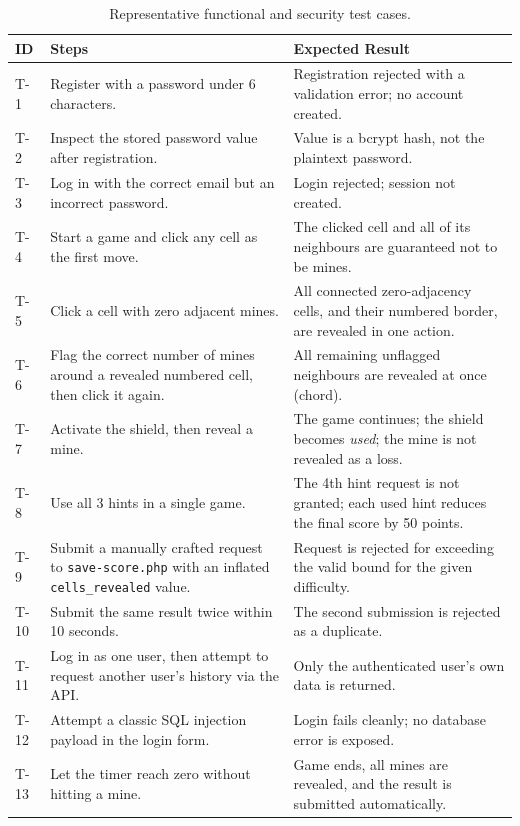 \begin{table}[h]
\centering
\caption{Representative functional and security test cases.}
\label{tab:test-cases}
\begin{tabular}{@{}p{1.2cm}p{5.3cm}p{6.2cm}@{}}
\toprule
\textbf{ID} & \textbf{Steps} & \textbf{Expected Result} \\
\midrule
T-1 & Register with a password under 6 characters. & Registration rejected with a validation error; no account created. \\
T-2 & Inspect the stored password value after registration. & Value is a bcrypt hash, not the plaintext password. \\
T-3 & Log in with the correct email but an incorrect password. & Login rejected; session not created. \\
T-4 & Start a game and click any cell as the first move. & The clicked cell and all of its neighbours are guaranteed not to be mines. \\
T-5 & Click a cell with zero adjacent mines. & All connected zero-adjacency cells, and their numbered border, are revealed in one action. \\
T-6 & Flag the correct number of mines around a revealed numbered cell, then click it again. & All remaining unflagged neighbours are revealed at once (chord). \\
T-7 & Activate the shield, then reveal a mine. & The game continues; the shield becomes \emph{used}; the mine is not revealed as a loss. \\
T-8 & Use all 3 hints in a single game. & The 4th hint request is not granted; each used hint reduces the final score by 50 points. \\
T-9 & Submit a manually crafted request to \texttt{save-score.php} with an inflated \texttt{cells\_revealed} value. & Request is rejected for exceeding the valid bound for the given difficulty. \\
T-10 & Submit the same result twice within 10 seconds. & The second submission is rejected as a duplicate. \\
T-11 & Log in as one user, then attempt to request another user's history via the API. & Only the authenticated user's own data is returned. \\
T-12 & Attempt a classic SQL injection payload in the login form. & Login fails cleanly; no database error is exposed. \\
T-13 & Let the timer reach zero without hitting a mine. & Game ends, all mines are revealed, and the result is submitted automatically. \\
\bottomrule
\end{tabular}
\end{table}

